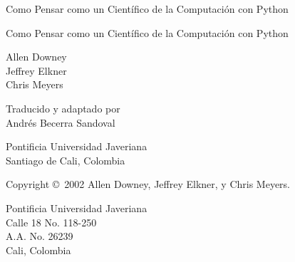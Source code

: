 \documentclass[a4paper, 11pt]{book}
\newcommand{\clearemptydoublepage}{\newpage{\pagestyle{empty}\cleardoublepage}}
\begin{document}
\frontmatter

\thispagestyle{empty}

\begin{flushright}
\vspace*{2.5in}
{\huge Como Pensar como un Científico de la Computación}
\vspace{0.25in}
{\LARGE con Python}
\vfill
\end{flushright}

\clearemptydoublepage

\pagebreak
\thispagestyle{empty}

\begin{flushright}
\vspace*{2.5in}
{\huge Como Pensar como un Científico de la Computación}
\vspace{0.25in}
{\LARGE con Python}
\vspace{0.5in}
\author{Allen Downey, Jeffrey Elkner y Chris Meyers}

{\small
Allen Downey\\
Jeffrey Elkner\\
Chris Meyers\\
}

\vspace{.25in}

{\small
Traducido y adaptado por\\
Andrés Becerra Sandoval \\
}

\vspace{0.5in}
{\Large Pontificia Universidad Javeriana} \\
{\small Santiago de Cali, Colombia}
\vfill
\end{flushright}


\pagebreak
\thispagestyle{empty}
Copyright \copyright ~2002 Allen Downey, Jeffrey Elkner, y Chris Meyers.
\vspace{0.25in}

\vspace{0.25in}

\begin{flushleft}
Pontificia Universidad Javeriana \\
Calle 18 No. 118-250 \\
A.A. No.  26239 \\
Cali, Colombia \\
\end{flushleft}
\end{document}
